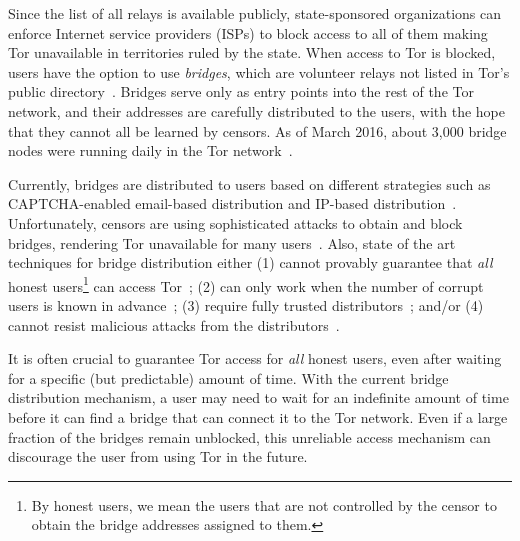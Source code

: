 \documentclass[letterpaper,twocolumn,10pt]{article}
\begin{document}

Since the list of all relays is available publicly, state-sponsored organizations can enforce Internet service providers (ISPs) to block access to all of them making Tor unavailable in territories ruled by the state. %
When access to Tor is blocked, users have the option to use \emph{bridges}, which are volunteer relays not listed in Tor's public directory~\cite{Dingledine06designof}. Bridges serve only as entry points into the rest of the Tor network, and their addresses are carefully distributed to the users, with the hope that they cannot all be learned by censors. 
As of March 2016, about 3,000 bridge nodes were running daily in the Tor network~\cite{Tor:Bridges}.

Currently, bridges are distributed to users based on different strategies such as CAPTCHA-enabled email-based distribution and IP-based distribution~\cite{Dingledine06designof}. Unfortunately, censors are using sophisticated attacks to obtain
and block bridges, rendering Tor unavailable for many users~\cite{Dingledine:Bridges:2011,Ling:2012:infocom,BridgeBlockingChina:2012}.
Also, state of the art techniques for bridge distribution either (1) cannot provably guarantee that \emph{all} honest users\footnote{By honest users, we mean the users that are not controlled by the censor to obtain the bridge addresses assigned to them.} can access Tor~\cite{WangLBH:rBridge:13,McCoy:FC:2011,Sovran:2008:PSN}; (2) can only work when the number of corrupt users is known in advance~\cite{Mahdian:2010}; (3) require fully trusted distributors~\cite{McCoy:FC:2011,Mahdian:2010,Sovran:2008:PSN}; and/or (4) cannot resist malicious attacks from the distributors~\cite{WangLBH:rBridge:13,McCoy:FC:2011,Mahdian:2010,Sovran:2008:PSN}.

It is often crucial to guarantee Tor access for \emph{all} honest users, even after waiting for a specific (but predictable) amount of time. With the current bridge distribution mechanism, a user may need to wait for an indefinite amount of time before it can find a bridge that can connect it to the Tor network. Even if a large fraction of the bridges remain unblocked, this unreliable access mechanism can discourage the user from using Tor in the future.
\end{document}
